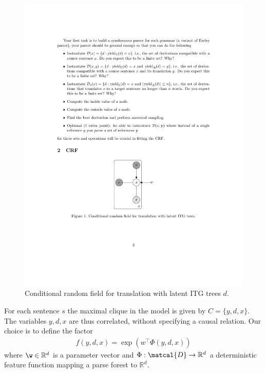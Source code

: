 \documentclass[11pt,a4paper]{article}
\begin{document}
\begin{figure}[H]
\center
    \includegraphics[scale=0.9]{images/graphical-model.pdf}
    \caption{Conditional random field for translation with latent ITG trees $d$.}
    \label{fig:crf}
\end{figure}
For each sentence $s$ the maximal clique in the model is given by $C=\{y, d, x\}$. The variables $y,d,x$ are thus correlated, without specifying a causal relation. Our choice is to define the factor
\begin{align*}
f(y,d,x) = \exp(w^{\top}\Phi(y,d,x)) 
\end{align*}
where $\w \in \mathbb{R}^d$ is a parameter vector and $\Phi: \matcal{D} \to \mathbb{R}^d$ a deterministic feature function mapping a parse forest to $\mathbb{R}^d$.
\end{document}
